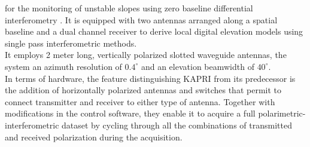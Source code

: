 for the monitoring of unstable slopes using zero baseline differential interferometry \cite{Massonnet1993}. It is equipped with two antennas arranged along a spatial baseline and a dual channel receiver to derive local digital elevation models using single pass interferometric methods.\\
It employs  2 meter long, vertically polarized slotted waveguide antennas, the system an azimuth resolution of $0.4^\circ$ and an elevation beamwidth of $40^\circ$.\\
In terms of hardware, the feature distinguishing KAPRI from its predecessor is the addition of horizontally polarized antennas and switches that permit to connect transmitter and receiver to either type of antenna. Together with modifications in the control software, they enable it to acquire a full polarimetric-interferometric dataset by cycling through all the combinations of transmitted and received polarization during the acquisition.
